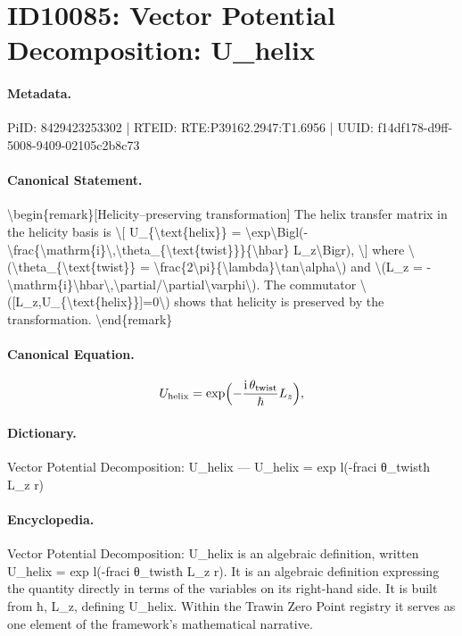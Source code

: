 \section*{ID10085: Vector Potential Decomposition: U\_helix}
\paragraph{Metadata.}
PiID: 8429423253302 | RTEID: RTE:P39162.2947:T1.6956 | UUID: f14df178-d9ff-5008-9409-02105c2b8c73

\paragraph{Canonical Statement.}
\textbackslash{}begin\{remark\}[Helicity–preserving transformation] The helix transfer matrix in the helicity basis is \textbackslash{}[ U\_\{\textbackslash{}text\{helix\}\} = \textbackslash{}exp\textbackslash{}Bigl(-\textbackslash{}frac\{\textbackslash{}mathrm\{i\}\textbackslash{},\textbackslash{}theta\_\{\textbackslash{}text\{twist\}\}\}\{\textbackslash{}hbar\} L\_z\textbackslash{}Bigr), \textbackslash{}] where \textbackslash{}(\textbackslash{}theta\_\{\textbackslash{}text\{twist\}\} = \textbackslash{}frac\{2\textbackslash{}pi\}\{\textbackslash{}lambda\}\textbackslash{}tan\textbackslash{}alpha\textbackslash{}) and \textbackslash{}(L\_z = -\textbackslash{}mathrm\{i\}\textbackslash{}hbar\textbackslash{},\textbackslash{}partial/\textbackslash{}partial\textbackslash{}varphi\textbackslash{}). The commutator \textbackslash{}([L\_z,U\_\{\textbackslash{}text\{helix\}\}]=0\textbackslash{}) shows that helicity is preserved by the transformation. \textbackslash{}end\{remark\}

\paragraph{Canonical Equation.}
\[
U_{\text{helix}} = \exp\Bigl(-\frac{\mathrm{i}\,\theta_{\text{twist}}}{\hbar} L_z\Bigr),
\]

\paragraph{Dictionary.}
Vector Potential Decomposition: U\_helix — U\_helix = exp l(-fraci θ\_twistħ L\_z r)

\paragraph{Encyclopedia.}
Vector Potential Decomposition: U\_helix is an algebraic definition, written U\_helix = exp l(-fraci θ\_twistħ L\_z r). It is an algebraic definition expressing the quantity directly in terms of the variables on its right-hand side. It is built from ħ, L\_z, defining U\_helix. Within the Trawin Zero Point registry it serves as one element of the framework's mathematical narrative.
